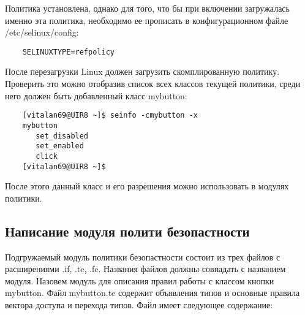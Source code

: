 \documentclass{./../class/UIR}
\begin{document}
	Политика установлена, однако для того, что бы при включении загружалась именно
	эта политика, необходимо ее прописать в конфигурационном файле
	/etc/selinux/config:
	\begin{verbatim}
	SELINUXTYPE=refpolicy
	\end{verbatim}
	После перезагрузки Linux должен загрузить скомплированную политику. Проверить
	это можно отобразив список всех классов текущей политики, среди него должен
	быть добавленный класс mybutton:
	\begin{verbatim}
	[vitalan69@UIR8 ~]$ seinfo -cmybutton -x
   	mybutton
       set_disabled
       set_enabled
       click
	[vitalan69@UIR8 ~]$ 
	\end{verbatim}
	После этого данный класс и его разрешения можно использовать в модулях
	политики.
	
	\subsection{Написание модуля полити безопастности}
	Подгружаемый модуль политики безопастности состоит из трех файлов с
	расширениями .if, .te, .fc. Названия файлов должны совпадать с названием
	модуля. Назовем модуль для описания правил работы с классом кнопки	mybutton. 
	Файл mybutton.te содержит объявления типов и основные правила вектора доступа и
	перехода типов. Файл имеет следующее содержание:
\end{document}
